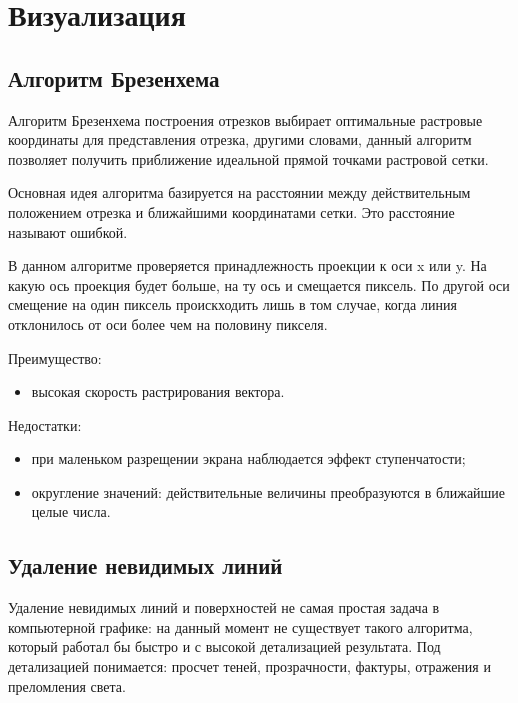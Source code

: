 \section{Визуализация}

\subsection{Алгоритм Брезенхема}
\hspace{0.6cm}Алгоритм Брезенхема построения отрезков выбирает оптимальные растровые координаты для представления отрезка, другими словами, данный алгоритм позволяет получить приближение идеальной прямой точками растровой сетки.

\vspace{0.3cm}Основная идея алгоритма базируется на расстоянии между действительным положением отрезка и ближайшими координатами сетки. Это расстояние называют ошибкой\cite{book:rojers}.

\vspace{0.3cm}В данном алгоритме проверяется принадлежность проекции к оси x или y. На какую ось проекция будет больше, на ту ось и смещается пиксель. По другой оси смещение на один пиксель проискходить лишь в том случае, когда линия отклонилось от оси более чем на половину пикселя.

\vspace{0.3cm}Преимущество:
\begin{itemize}
	\item высокая скорость растрирования вектора.
\end{itemize}

\vspace{0.3cm}Недостатки:
\begin{itemize}
	\item при маленьком разрещении экрана наблюдается эффект ступенчатости;
	\item округление значений: действительные величины преобразуются в ближайшие целые числа. 
\end{itemize}

\subsection{Удаление невидимых линий}
\hspace{0.6cm}Удаление невидимых линий и поверхностей не самая простая задача в компьютерной графике: на данный момент не существует такого алгоритма, который работал бы быстро и с высокой детализацией результата. Под детализацией понимается: просчет теней, прозрачности, фактуры, отражения и преломления света.

